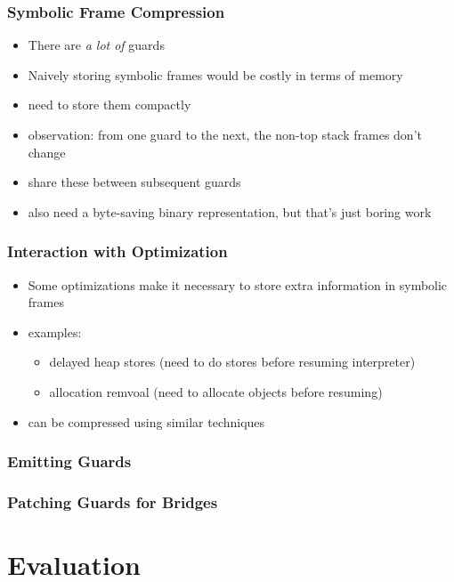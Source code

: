 \documentclass[utf8x]{beamer}
\begin{document}
\begin{frame}
  \frametitle{Symbolic Frame Compression}
  \begin{itemize}
      \item There are \emph{a lot of} guards
      \item Naively storing symbolic frames would be costly in terms of memory
      \item need to store them compactly
      \item observation: from one guard to the next, the non-top stack frames don't change
      \item share these between subsequent guards
      \pause
      \item also need a byte-saving binary representation, but that's just boring work
  \end{itemize}
\end{frame}

\begin{frame}
  \frametitle{Interaction with Optimization}
  \begin{itemize}
      \item Some optimizations make it necessary to store extra information in symbolic frames
      \item examples:
          \begin{itemize}
              \item delayed heap stores (need to do stores before resuming interpreter)
              \item allocation remvoal (need to allocate objects before resuming)
          \end{itemize}
      \item can be compressed using similar techniques
  \end{itemize}
\end{frame}

\begin{frame}
  \frametitle{Emitting Guards}
\end{frame}

\begin{frame}
  \frametitle{Patching Guards for Bridges}
\end{frame}

\section{Evaluation}

\end{document}

